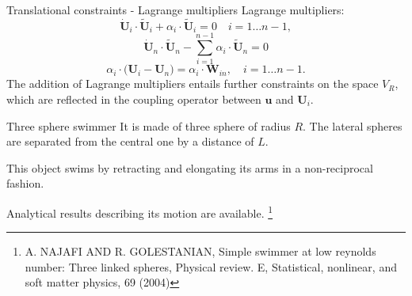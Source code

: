 \documentclass{beamer}
\begin{document}
\begin{frame}{Translational constraints - Lagrange multipliers}
	Lagrange multipliers:
	\begin{equation*}
		\dot{\textbf{U}}_i \cdot \tilde{\textbf{U}}_i +\alpha_i \cdot \tilde{\textbf{U}}_i= 0 \quad i=1\ldots n-1,
		\label{Eq:Trans2}
	\end{equation*}
	\begin{equation*}
		\dot{\textbf{U}}_n \cdot \tilde{\textbf{U}}_n -\sum_{i=1}^{n-1}\alpha_i \cdot \tilde{\textbf{U}}_n= 0%
		\label{Eq:Trans3}
	\end{equation*}
	\begin{equation*}
		{\alpha_i \cdot(\textbf{U}_i-\textbf{U}_n} )= \alpha_i \cdot \textbf{W}_{in}, \quad i=1\ldots n-1.
		\label{Eq:Multipliers}
	\end{equation*}
	The addition of Lagrange multipliers entails further constraints on the space $V_R$, which are reflected in the coupling operator between $\textbf{u}$ and $\textbf{U}_i$.
\end{frame}
	\begin{frame}{Three sphere swimmer}
		It is made of three sphere of radius $R$. The lateral spheres are separated from the central one by a distance of $L$. 
		
		This object swims by retracting and elongating its arms in a non-reciprocal fashion.
		
		\begin{figure}
		\end{figure}
		Analytical results describing its motion are available.
		\footnote{\tiny A. NAJAFI AND R. GOLESTANIAN, Simple swimmer at low reynolds number: Three linked spheres, Physical
		review. E, Statistical, nonlinear, and soft matter physics, 69 (2004)}
	\end{frame}
\end{document}
